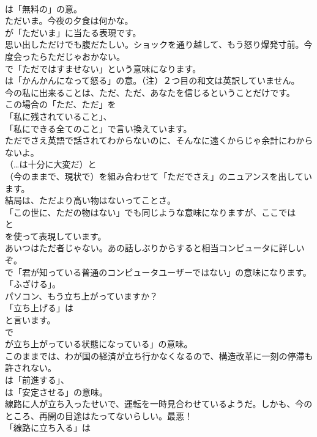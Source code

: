 \documentclass[8pt]{extreport}
\begin{document}
\begin{CJK}{UTF8}{min}
\\	は「無料の」の意。	
\\	ただいま。今夜の夕食は何かな。 
\\	が「ただいま」に当たる表現です。	
\\	思い出しただけでも腹だたしい。ショックを通り越して、もう怒り爆発寸前。今度会ったらただじゃおかない。 
\\	で「ただではすませない」という意味になります。
\\	は「かんかんになって怒る」の意。（注）２つ目の和文は英訳していません。	
\\	今の私に出来ることは、ただ、ただ、あなたを信じるということだけです。 
\\	この場合の「ただ、ただ」を
\\	「私に残されていること」、
\\	「私にできる全てのこと」で言い換えています。	
\\	ただでさえ英語で話されてわからないのに、そんなに遠くからじゃ余計にわからないよ。 
\\	（…は十分に大変だ）と
\\	（今のままで、現状で）を組み合わせて「ただでさえ」のニュアンスを出しています。	
\\	結局は、ただより高い物はないってことさ。 
\\	「この世に、ただの物はない」でも同じような意味になりますが、ここでは
\\	と
\\	を使って表現しています。	
\\	あいつはただ者じゃない。あの話しぶりからすると相当コンピュータに詳しいぞ。 
\\	で「君が知っている普通のコンピュータユーザーではない」の意味になります。
\\	「ふざける」。	
\\	パソコン、もう立ち上がっていますか？ 
\\	「立ち上げる」は
\\	と言います。
\\	で
\\	が立ち上がっている状態になっている」の意味。	
\\	このままでは、わが国の経済が立ち行かなくなるので、構造改革に一刻の停滞も許されない。 
\\	は「前進する」、
\\	は「安定させる」の意味。	
\\	線路に人が立ち入ったせいで、運転を一時見合わせているようだ。しかも、今のところ、再開の目途はたってないらしい。最悪！ 
\\	「線路に立ち入る」は

\end{CJK}
\end{document}
